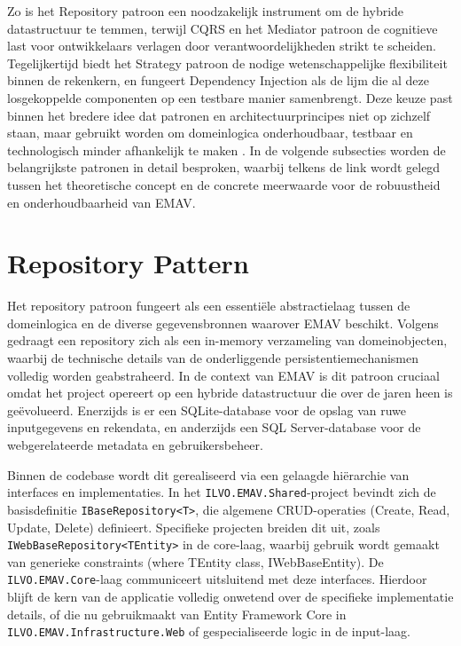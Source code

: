 Zo is het Repository patroon een noodzakelijk instrument om de hybride datastructuur te temmen, terwijl CQRS en het Mediator patroon de cognitieve last voor ontwikkelaars verlagen door verantwoordelijkheden strikt te scheiden. Tegelijkertijd biedt het Strategy patroon de nodige wetenschappelijke flexibiliteit binnen de rekenkern, en fungeert Dependency Injection als de lijm die al deze losgekoppelde componenten op een testbare manier samenbrengt. Deze keuze past binnen het bredere idee dat patronen en architectuurprincipes niet op zichzelf staan, maar gebruikt worden om domeinlogica onderhoudbaar, testbaar en technologisch minder afhankelijk te maken \autocite{millett2015patterns,seemann2019di}. In de volgende subsecties worden de belangrijkste patronen in detail besproken, waarbij telkens de link wordt gelegd tussen het theoretische concept en de concrete meerwaarde voor de robuustheid en onderhoudbaarheid van EMAV.

\section{Repository Pattern}
{\sloppy Het repository patroon fungeert als een essentiële abstractielaag tussen de domeinlogica en de diverse gegevensbronnen waarover EMAV beschikt. Volgens \textcite{fowlerRepository} gedraagt een repository zich als een in-memory verzameling van domeinobjecten, waarbij de technische details van de onderliggende persistentiemechanismen volledig worden geabstraheerd. In de context van EMAV is dit patroon cruciaal omdat het project opereert op een hybride datastructuur die over de jaren heen is geëvolueerd. Enerzijds is er een SQLite-database voor de opslag van ruwe inputgegevens en rekendata, en anderzijds een SQL Server-database voor de webgerelateerde metadata en gebruikersbeheer.\par}

Binnen de codebase wordt dit gerealiseerd via een gelaagde hiërarchie van interfaces en implementaties. 
In het \texttt{ILVO.EMAV.Shared}-project bevindt zich de basisdefinitie \texttt{IBaseRepository<T>}, die algemene CRUD-operaties (Create, Read, Update, Delete) definieert. 
Specifieke projecten breiden dit uit, zoals \texttt{IWebBaseRepository<TEntity>} in de core-laag, waarbij gebruik wordt gemaakt van generieke constraints (where TEntity \: class, IWebBaseEntity). 
De \texttt{ILVO.EMAV.Core}-laag communiceert uitsluitend met deze interfaces. 
Hierdoor blijft de kern van de applicatie volledig onwetend over de specifieke implementatie details, of die nu gebruikmaakt van Entity Framework Core in \texttt{ILVO.EMAV.Infrastructure.Web} of gespecialiseerde logic in de input-laag.

